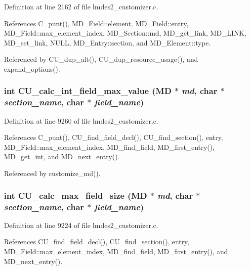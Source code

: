 Definition at line 2162 of file lmdes2\_\-customizer.c.

References C\_\-punt(), MD\_\-Field::element, MD\_\-Field::entry, MD\_\-Field::max\_\-element\_\-index, MD\_\-Section::md, MD\_\-get\_\-link, MD\_\-LINK, MD\_\-set\_\-link, NULL, MD\_\-Entry::section, and MD\_\-Element::type.

Referenced by CU\_\-dup\_\-alt(), CU\_\-dup\_\-resource\_\-usage(), and expand\_\-options().
\subsubsection{\setlength{\rightskip}{0pt plus 5cm}int CU\_\-calc\_\-int\_\-field\_\-max\_\-value (\bf{MD} $\ast$ {\em md}, char $\ast$ {\em section\_\-name}, char $\ast$ {\em field\_\-name})}\label{lmdes2__customizer_8c_5dd5fab3cd53184cc8789f2e2c3ba33a}




Definition at line 9260 of file lmdes2\_\-customizer.c.

References C\_\-punt(), CU\_\-find\_\-field\_\-decl(), CU\_\-find\_\-section(), entry, MD\_\-Field::max\_\-element\_\-index, MD\_\-find\_\-field, MD\_\-first\_\-entry(), MD\_\-get\_\-int, and MD\_\-next\_\-entry().

Referenced by customize\_\-md().
\subsubsection{\setlength{\rightskip}{0pt plus 5cm}int CU\_\-calc\_\-max\_\-field\_\-size (\bf{MD} $\ast$ {\em md}, char $\ast$ {\em section\_\-name}, char $\ast$ {\em field\_\-name})}\label{lmdes2__customizer_8c_ebb6e3da59774d2be9fea3034f0e749a}




Definition at line 9224 of file lmdes2\_\-customizer.c.

References CU\_\-find\_\-field\_\-decl(), CU\_\-find\_\-section(), entry, MD\_\-Field::max\_\-element\_\-index, MD\_\-find\_\-field, MD\_\-first\_\-entry(), and MD\_\-next\_\-entry().


